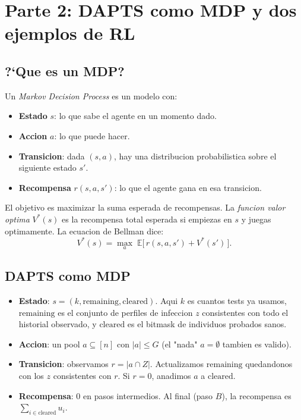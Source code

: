 \documentclass[11pt]{article}
\begin{document}
\section{Parte 2: DAPTS como MDP y dos ejemplos de RL}

\subsection{?`Que es un MDP?}

Un \emph{Markov Decision Process} es un modelo con:
\begin{itemize}
  \item \textbf{Estado} $s$: lo que sabe el agente en un momento dado.
  \item \textbf{Accion} $a$: lo que puede hacer.
  \item \textbf{Transicion}: dada $(s, a)$, hay una distribucion
    probabilistica sobre el siguiente estado $s'$.
  \item \textbf{Recompensa} $r(s, a, s')$: lo que el agente gana en
    esa transicion.
\end{itemize}

El objetivo es maximizar la suma esperada de recompensas. La
\emph{funcion valor optima} $V^*(s)$ es la recompensa total esperada
si empiezas en $s$ y juegas optimamente. La ecuacion de Bellman dice:
\[
V^*(s) = \max_a \; \mathbb{E}\big[\, r(s,a,s') + V^*(s') \,\big].
\]

\subsection{DAPTS como MDP}

\begin{itemize}
  \item \textbf{Estado}: $s = (k, \text{remaining}, \text{cleared})$.
    Aqui $k$ es cuantos tests ya usamos, $\text{remaining}$ es el
    conjunto de perfiles de infeccion $z$ consistentes con todo el
    historial observado, y $\text{cleared}$ es el bitmask de
    individuos probados sanos.
  \item \textbf{Accion}: un pool $a \subseteq [n]$ con $\lvert a \rvert \le G$
    (el "nada" $a = \emptyset$ tambien es valido).
  \item \textbf{Transicion}: observamos $r = \lvert a \cap Z \rvert$.
    Actualizamos $\text{remaining}$ quedandonos con los $z$
    consistentes con $r$. Si $r = 0$, anadimos $a$ a $\text{cleared}$.
  \item \textbf{Recompensa}: $0$ en pasos intermedios. Al final (paso
    $B$), la recompensa es $\sum_{i \in \text{cleared}} u_i$.
\end{itemize}
\end{document}
